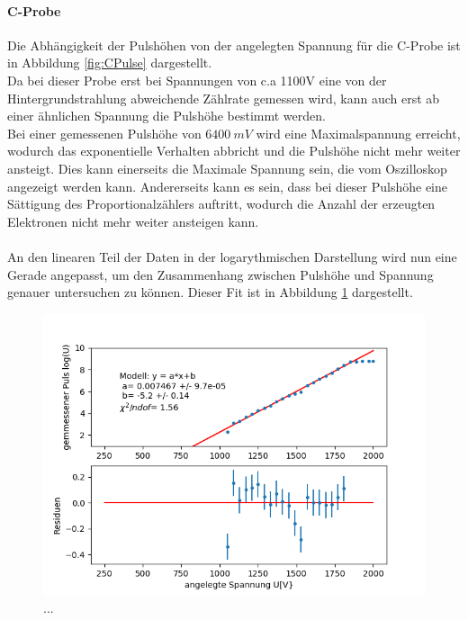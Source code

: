 \documentclass[12pt,a4paper]{article}
\begin{document}
\paragraph{C-Probe}
Die Abhängigkeit der Pulshöhen von der angelegten Spannung für die C-Probe ist in Abbildung \ref{fig:CPulse} dargestellt.\\
Da bei dieser Probe erst bei Spannungen von c.a 1100V eine von der Hintergrundstrahlung abweichende Zählrate gemessen wird, kann auch erst ab einer ähnlichen Spannung die Pulshöhe bestimmt werden.\\
Bei einer gemessenen Pulshöhe von $\SI{6400}{mV}$ wird eine Maximalspannung erreicht, wodurch das exponentielle Verhalten abbricht und die Pulshöhe nicht mehr weiter ansteigt. Dies kann einerseits die Maximale Spannung sein, die vom Oszilloskop angezeigt werden kann. Andererseits kann es sein, dass bei dieser Pulshöhe eine Sättigung des Proportionalzählers auftritt, wodurch die Anzahl der erzeugten Elektronen nicht mehr weiter ansteigen kann.\\
\\
An den linearen Teil der Daten in der logarythmischen Darstellung wird nun eine Gerade angepasst, um den Zusammenhang zwischen Pulshöhe und Spannung genauer untersuchen zu können. Dieser Fit ist in Abbildung \ref{fig:CPulsfit} dargestellt.\\

\begin{figure}
\centering
\includegraphics[scale=0.8]{Bilder/Prop/C_Pulsfit.PNG}
\caption{...}
\label{fig:CPulsfit}
\end{figure}
\end{document}
